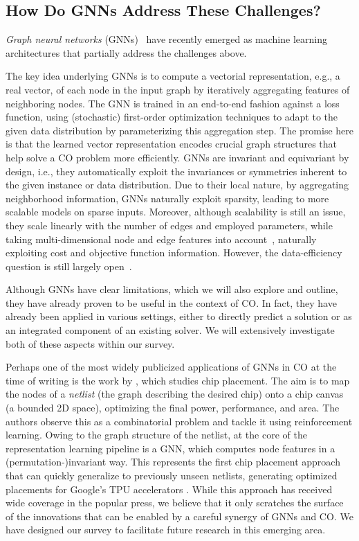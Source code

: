 \documentclass[twoside,11pt]{article}
\begin{document}
\subsection{How Do GNNs Address These Challenges?}
\emph{Graph neural networks} (GNNs)~\citep{Gil+2017,Sca+2009} have recently emerged as machine learning architectures that partially address the challenges above.

The key idea underlying GNNs is to compute a vectorial representation, e.g., a real vector, of each node in the input graph by iteratively aggregating features of neighboring nodes. The GNN is trained in an end-to-end fashion against a loss function, using (stochastic) first-order optimization techniques to adapt to the given data distribution by parameterizing this aggregation step. The promise here is that the learned vector representation encodes crucial graph structures that help solve a CO problem more efficiently. GNNs are invariant and equivariant by design, i.e., they automatically exploit the invariances or symmetries inherent to the given instance or data distribution. Due to their local nature, by aggregating neighborhood information, GNNs naturally exploit sparsity, leading to more scalable models on sparse inputs. Moreover, although scalability is still an issue, they scale linearly with the number of edges and employed parameters, while taking  multi-dimensional node and edge features into account~\citep{Gil+2017}, naturally exploiting cost and objective function information. However, the data-efficiency question is still largely open~\citep{Mor+2021}.

Although GNNs have clear limitations, which we will also explore and outline, they have already proven to be useful in the context of CO. In fact, they have already been applied in various settings, either to directly predict a solution or as an integrated component of an existing solver. We will extensively investigate both of these aspects within our survey.

Perhaps one of the most widely publicized applications of GNNs in CO at the time of writing is the work by \citet{mirhoseini2020chip}, which studies chip placement. The aim is to map the nodes of a \emph{netlist} (the graph describing the desired chip) onto a chip canvas (a bounded 2D space), optimizing the final power, performance, and area. The authors observe this as a combinatorial problem and tackle it using reinforcement learning. Owing to the graph structure of the netlist, at the core of the representation learning pipeline is a GNN, which computes node features in a (permutation-)invariant way. This represents the first chip placement approach that can quickly generalize to previously unseen netlists, generating optimized placements for Google's TPU accelerators \citep{jouppi2017datacenter}. While this approach has received wide coverage in the popular press, we believe that it only scratches the surface of the innovations that can be enabled by a careful synergy of GNNs and CO. We have designed our survey to facilitate future research in this emerging area. 
\end{document}

